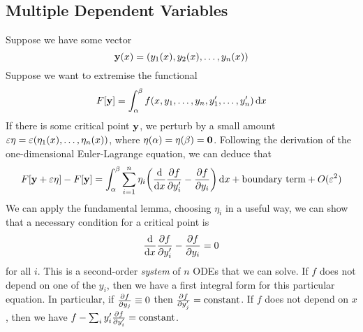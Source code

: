 \subsection{Multiple Dependent Variables}
Suppose we have some vector
\[
	\vb y(x) = (y_1(x), y_2(x), \dots, y_n(x))
\]
Suppose we want to extremise the functional
\[
	F[\vb y] = \int_\alpha^\beta f(x, y_1, \dots, y_n, y'_1, \dots, y'_n) \dd{x}
\]
If there is some critical point \( \vb y \), we perturb by a small amount \( \varepsilon\vb \eta = \varepsilon(\eta_1(x), \dots, \eta_n(x)) \), where \( \vb\eta(\alpha) = \vb\eta(\beta) = \vb 0 \).
Following the derivation of the one-dimensional Euler-Lagrange equation, we can deduce that
\[
	F[\vb y + \varepsilon \vb \eta] - F[\vb y] = \int_\alpha^\beta \sum_{i=1}^n \eta_i \qty(\dv{x}\pdv{f}{y_i'} - \pdv{f}{y_i})\dd{x} + \text{boundary term} + O(\varepsilon^2)
\]
We can apply the fundamental lemma, choosing \( \eta_i \) in a useful way, we can show that a necessary condition for a critical point is
\[
	\dv{x}\pdv{f}{y_i'} - \pdv{f}{y_i} = 0
\]
for all \( i \).
This is a second-order \textit{system} of \( n \) ODEs that we can solve.
If \( f \) does not depend on one of the \( y_i \), then we have a first integral form for this particular equation.
In particular, if \( \pdv{f}{y_j} \equiv 0 \) then \( \pdv{f}{y_j'} = \text{constant} \).
If \( f \) does not depend on \( x \), then we have \( f - \sum_i y_i' \pdv{f}{y_i'} = \text{constant} \).
